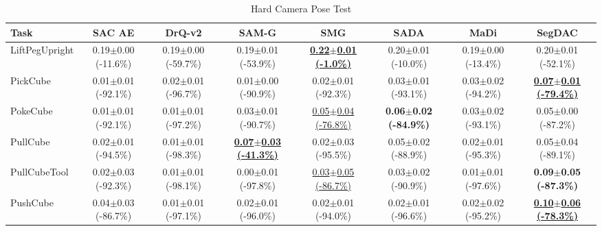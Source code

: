 \begin{table}[htbp]
\centering
\scriptsize
\caption{Hard Camera Pose Test}
\label{tab:appendix_cameraposetest_hard}
\begin{adjustbox}{max width=\textwidth}
\begin{tabular}{l*{7}{c}}
\toprule
\textbf{Task} & \textbf{SAC AE} & \textbf{DrQ-v2} & \textbf{SAM-G} & \textbf{SMG} & \textbf{SADA} & \textbf{MaDi} & \textbf{SegDAC} \\
\midrule
LiftPegUpright & 0.19$\pm$0.00 \scriptsize{(-11.6\%)} & 0.19$\pm$0.00 \scriptsize{(-59.7\%)} & 0.19$\pm$0.01 \scriptsize{(-53.9\%)} & \textbf{\underline{0.22$\pm$0.01 \scriptsize{(-1.0\%)}}} & 0.20$\pm$0.01 \scriptsize{(-10.0\%)} & 0.19$\pm$0.00 \scriptsize{(-13.4\%)} & 0.20$\pm$0.01 \scriptsize{(-52.1\%)} \\
PickCube & 0.01$\pm$0.01 \scriptsize{(-92.1\%)} & 0.02$\pm$0.01 \scriptsize{(-96.7\%)} & 0.01$\pm$0.00 \scriptsize{(-90.9\%)} & 0.02$\pm$0.01 \scriptsize{(-92.3\%)} & 0.03$\pm$0.01 \scriptsize{(-93.1\%)} & 0.03$\pm$0.02 \scriptsize{(-94.2\%)} & \textbf{\underline{0.07$\pm$0.01 \scriptsize{(-79.4\%)}}} \\
PokeCube & 0.01$\pm$0.01 \scriptsize{(-92.1\%)} & 0.01$\pm$0.01 \scriptsize{(-97.2\%)} & 0.03$\pm$0.01 \scriptsize{(-90.7\%)} & \underline{0.05$\pm$0.04 \scriptsize{(-76.8\%)}} & \textbf{0.06$\pm$0.02 \scriptsize{(-84.9\%)}} & 0.03$\pm$0.02 \scriptsize{(-93.1\%)} & 0.05$\pm$0.00 \scriptsize{(-87.2\%)} \\
PullCube & 0.02$\pm$0.01 \scriptsize{(-94.5\%)} & 0.01$\pm$0.01 \scriptsize{(-98.3\%)} & \textbf{\underline{0.07$\pm$0.03 \scriptsize{(-41.3\%)}}} & 0.02$\pm$0.03 \scriptsize{(-95.5\%)} & 0.05$\pm$0.02 \scriptsize{(-88.9\%)} & 0.02$\pm$0.01 \scriptsize{(-95.3\%)} & 0.05$\pm$0.04 \scriptsize{(-89.1\%)} \\
PullCubeTool & 0.02$\pm$0.03 \scriptsize{(-92.3\%)} & 0.01$\pm$0.01 \scriptsize{(-98.1\%)} & 0.00$\pm$0.01 \scriptsize{(-97.8\%)} & \underline{0.03$\pm$0.05 \scriptsize{(-86.7\%)}} & 0.03$\pm$0.02 \scriptsize{(-90.9\%)} & 0.01$\pm$0.01 \scriptsize{(-97.6\%)} & \textbf{0.09$\pm$0.05 \scriptsize{(-87.3\%)}} \\
PushCube & 0.04$\pm$0.03 \scriptsize{(-86.7\%)} & 0.01$\pm$0.01 \scriptsize{(-97.1\%)} & 0.02$\pm$0.01 \scriptsize{(-96.0\%)} & 0.02$\pm$0.01 \scriptsize{(-94.0\%)} & 0.02$\pm$0.01 \scriptsize{(-96.6\%)} & 0.02$\pm$0.02 \scriptsize{(-95.2\%)} & \textbf{\underline{0.10$\pm$0.06 \scriptsize{(-78.3\%)}}} \\

\end{tabular}
\end{adjustbox}
\end{table}

